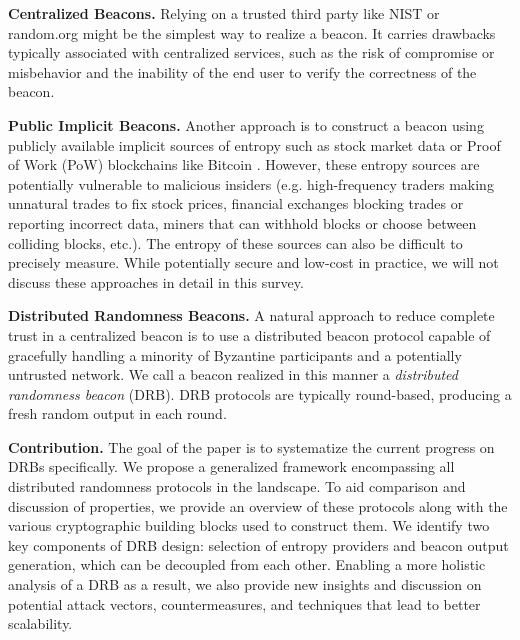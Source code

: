 \documentclass[conference]{IEEEtran}
\theoremstyle{definition}
\theoremstyle{remark}
\begin{document}
\textbf{Centralized Beacons.} Relying on a trusted third party like NIST \cite{fischer2011public} or random.org \cite{haahr2010random} might be the simplest way to realize a beacon. It carries drawbacks typically associated with centralized services, such as the risk of compromise or misbehavior and the inability of the end user to verify the correctness of the beacon.

\textbf{Public Implicit Beacons.} Another approach is to construct a beacon using publicly available implicit sources of entropy such as stock market data \cite{clark2010use} or Proof of Work (PoW) blockchains like Bitcoin \cite{nakamoto2008bitcoin, bentov2016bitcoin,bonneau2015bitcoin, han2020randchain}. However, these entropy sources are potentially vulnerable to malicious insiders (e.g. high-frequency traders making unnatural trades to fix stock prices, financial exchanges blocking trades or reporting incorrect data, miners that can withhold blocks or choose between colliding blocks, etc.). The entropy of these sources can also be difficult to precisely measure. While potentially secure and low-cost in practice, we will not discuss these approaches in detail in this survey.

\textbf{Distributed Randomness Beacons.}
A natural approach to reduce complete trust in a centralized beacon is to use a distributed beacon protocol capable of gracefully handling a minority of Byzantine participants and a potentially untrusted network. We call a beacon realized in this manner a \textit{distributed randomness beacon} (DRB). DRB protocols are typically round-based, producing a fresh random output in each round.

\textbf{Contribution.} The goal of the paper is to systematize the current progress on DRBs specifically. We propose a generalized framework encompassing all distributed randomness protocols in the landscape. To aid comparison and discussion of properties, we provide an overview of these protocols along with the various cryptographic building blocks used to construct them. We identify two key components of DRB design: selection of entropy providers and beacon output generation, which can be decoupled from each other. Enabling a more holistic analysis of a DRB as a result, we also provide new insights and discussion on potential attack vectors, countermeasures, and techniques that lead to better scalability.
\end{document}
